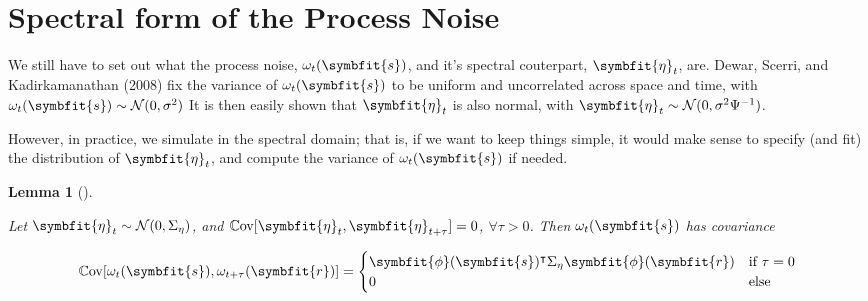 \documentclass[
]{report}
\DeclareMathOperator{\cov}{\mathbb{C}\mathrm{ov}}
\newcommand{\bv}[1]{\symbfit{#1}}
\theoremstyle{plain}
\theoremstyle{plain}
\theoremstyle{plain}
\newtheorem{lemma}{Lemma}[section]
\theoremstyle{remark}
\begin{document}
\section{Spectral form of the Process
Noise}\label{spectral-form-of-the-process-noise}

We still have to set out what the process noise, \(\omega_t(\bv s)\),
and it's spectral couterpart, \(\bv \eta_t\), are. Dewar, Scerri, and
Kadirkamanathan (2008) fix the variance of \(\omega_t(\bv s)\) to be
uniform and uncorrelated across space and time, with
\(\omega_t(\bv s) \sim \mathcal N(0,\sigma^2)\) It is then easily shown
that \(\bv\eta_t\) is also normal, with
\(\bv\eta_t \sim \mathcal N(0, \sigma^2\Psi^{-1})\).

However, in practice, we simulate in the spectral domain; that is, if we
want to keep things simple, it would make sense to specify (and fit) the
distribution of \(\bv\eta_t\), and compute the variance of
\(\omega_t(\bv s)\) if needed.

\begin{lemma}[]\protect\hypertarget{lem-omegadist}{}\label{lem-omegadist}

Let \(\bv\eta_t \sim \mathcal N(0, \Sigma_\eta)\), and
\(\cov[\bv\eta_t, \bv \eta_{t+\tau}] =0\), \(\forall \tau>0\). Then
\(\omega_t(\bv s)\) has covariance

\[\cov [\omega_t(\bv s), \omega_{t+\tau}(\bv r)] = \begin{cases}
\bv\phi(\bv s)^\intercal \Sigma_\eta \bv\phi(\bv r) & \text{if }\tau=0\\
0 & \text{else}\\
\end{cases}
\]

\end{lemma}
\end{document}
